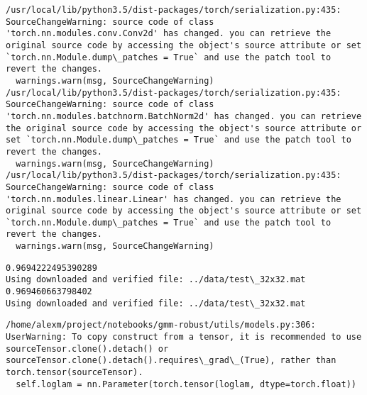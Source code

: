 \documentclass[11pt]{article}
\begin{document}
    \begin{Verbatim}[commandchars=\\\{\}]
/usr/local/lib/python3.5/dist-packages/torch/serialization.py:435: SourceChangeWarning: source code of class 'torch.nn.modules.conv.Conv2d' has changed. you can retrieve the original source code by accessing the object's source attribute or set `torch.nn.Module.dump\_patches = True` and use the patch tool to revert the changes.
  warnings.warn(msg, SourceChangeWarning)
/usr/local/lib/python3.5/dist-packages/torch/serialization.py:435: SourceChangeWarning: source code of class 'torch.nn.modules.batchnorm.BatchNorm2d' has changed. you can retrieve the original source code by accessing the object's source attribute or set `torch.nn.Module.dump\_patches = True` and use the patch tool to revert the changes.
  warnings.warn(msg, SourceChangeWarning)
/usr/local/lib/python3.5/dist-packages/torch/serialization.py:435: SourceChangeWarning: source code of class 'torch.nn.modules.linear.Linear' has changed. you can retrieve the original source code by accessing the object's source attribute or set `torch.nn.Module.dump\_patches = True` and use the patch tool to revert the changes.
  warnings.warn(msg, SourceChangeWarning)

    \end{Verbatim}

    \begin{Verbatim}[commandchars=\\\{\}]
0.9694222495390289
Using downloaded and verified file: ../data/test\_32x32.mat
0.969460663798402
Using downloaded and verified file: ../data/test\_32x32.mat

    \end{Verbatim}

    \begin{Verbatim}[commandchars=\\\{\}]
/home/alexm/project/notebooks/gmm-robust/utils/models.py:306: UserWarning: To copy construct from a tensor, it is recommended to use sourceTensor.clone().detach() or sourceTensor.clone().detach().requires\_grad\_(True), rather than torch.tensor(sourceTensor).
  self.loglam = nn.Parameter(torch.tensor(loglam, dtype=torch.float))

    \end{Verbatim}
\end{document}
